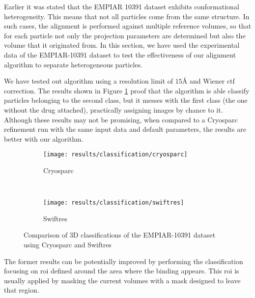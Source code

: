 \documentclass[../main.tex]{subfiles}
\begin{document}
Earlier it was stated that the EMPIAR 10391 dataset exhibits conformational heterogeneity. This means that not all particles come from the same structure. In such cases, the alignment is performed against multiple reference volumes, so that for each particle not only the projection parameters are determined but also the volume that it originated from. In this section, we have used the experimental data of the EMPIAR-10391 dataset to test the effectiveness of our alignment algorithm to separate heterogeneous particles.

We have tested out algorithm using a resolution limit of $15 \si{\angstrom}$ and Wiener \gls{ctf} correction. The results shown in Figure \ref{fig:5:3d_classification} proof that the algorithm is able classify particles belonging to the second class, but it messes with the first class (the one without the drug attached), practically assigning images by chance to it. Although these results may not be promising, when compared to a Cryosparc refinement run with the same input data and default parameters, the results are better with our algorithm. 

\begin{figure}[htbp]
    \centering
    \begin{subfigure}[b]{.8\textwidth}
         \centering
         \texttt{[image: results/classification/cryosparc]}
         \caption{Cryosparc}
    \end{subfigure}\\
    \vspace{2em}
    \begin{subfigure}[b]{.8\textwidth}
         \centering
         \texttt{[image: results/classification/swiftres]}
         \caption{Swiftres}
    \end{subfigure}
    \caption{Comparison of 3D classifications of the EMPIAR-10391 dataset using Cryosparc and Swiftres}
    \label{fig:5:3d_classification}
\end{figure}

The former results can be potentially improved by performing the classification focusing on \gls{roi} defined around the area where the binding appears. This \gls{roi} is usually applied by masking the current volumes with a mask designed to leave that region.
\end{document}
